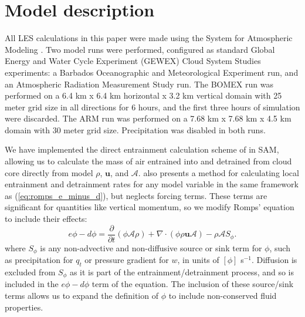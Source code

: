 \documentclass[12pt]{article}
\begin{document}

\section{Model description}

All LES calculations in this paper were made using the System for Atmospheric 
Modeling \citep[SAM;][]{Khairoutdinov2003}.  Two model runs were performed, 
configured as standard Global Energy and Water Cycle Experiment (GEWEX) 
Cloud System Studies \citep[GCSS;][]{Randall2003} experiments: a Barbados 
Oceanographic and Meteorological Experiment \citep[BOMEX;][]{Siebesma2003} run,
and an Atmospheric Radiation Measurement Study \citep[ARM;][]{Brown2002} run. 
The BOMEX run was performed on a 6.4 km x 6.4 km horizontal x 3.2 km vertical 
domain with 25 meter grid size in all directions for 6 hours, and the first 
three hours of simulation were discarded. The ARM run was performed on a 
7.68 km x 7.68 km x 4.5 km domain with 30 meter grid size.  Precipitation was 
disabled in both runs.

We have implemented the direct entrainment calculation scheme of 
\cite{Romps2010} in SAM, allowing us to calculate the mass of air 
entrained into and detrained from cloud core directly from model $\rho$, 
$\mathbf{u}$, and $\mathcal{A}$.  \citet[eq. 4]{Romps2010} also 
presents a method for calculating local entrainment and detrainment rates 
for any model variable in the same framework as (\ref{eq:romps_e_minus_d}),
but neglects forcing terms.  These terms are significant for quantities 
like vertical momentum, so we modify Romps' equation to include their 
effects:
\begin{equation}
  \label{eq:romps_ephi_minus_dphi}
  e\phi - d\phi = \frac{\partial}{\partial t}(\phi \mathcal{A} \rho) 
                + \nabla \cdot (\phi \rho \mathbf{u} \mathcal{A})
                - \rho \mathcal{A}S_\phi.
\end{equation}
where $S_\phi$ is any non-advective and non-diffusive source or sink term for 
$\phi$, such as precipitation for $q_t$ or pressure gradient for $w$, in units 
of $[\phi]$ s$^{-1}$.  Diffusion is excluded from $S_\phi$ as it is 
part of the entrainment/detrainment process, and so is included in the 
$e\phi - d\phi$ term of the equation.  The inclusion of these source/sink 
terms allows us to expand the definition of $\phi$ to include non-conserved 
fluid properties.
\end{document}
